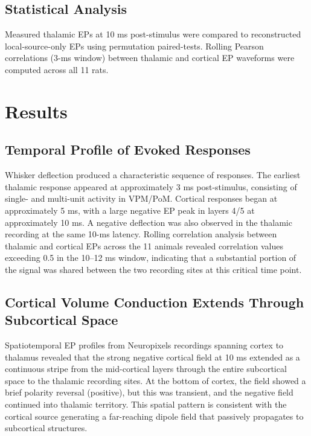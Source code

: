 \documentclass[12pt]{article}
\begin{document}
\subsection{Statistical Analysis}

Measured thalamic EPs at 10 ms post-stimulus were compared to reconstructed local-source-only EPs using permutation paired-tests. Rolling Pearson correlations (3-ms window) between thalamic and cortical EP waveforms were computed across all 11 rats.

\section{Results}

\subsection{Temporal Profile of Evoked Responses}

Whisker deflection produced a characteristic sequence of responses. The earliest thalamic response appeared at approximately 3 ms post-stimulus, consisting of single- and multi-unit activity in VPM/PoM. Cortical responses began at approximately 5 ms, with a large negative EP peak in layers 4/5 at approximately 10 ms. A negative deflection was also observed in the thalamic recording at the same 10-ms latency. Rolling correlation analysis between thalamic and cortical EPs across the 11 animals revealed correlation values exceeding 0.5 in the 10--12 ms window, indicating that a substantial portion of the signal was shared between the two recording sites at this critical time point.

\subsection{Cortical Volume Conduction Extends Through Subcortical Space}

Spatiotemporal EP profiles from Neuropixels recordings spanning cortex to thalamus revealed that the strong negative cortical field at 10 ms extended as a continuous stripe from the mid-cortical layers through the entire subcortical space to the thalamic recording sites. At the bottom of cortex, the field showed a brief polarity reversal (positive), but this was transient, and the negative field continued into thalamic territory. This spatial pattern is consistent with the cortical source generating a far-reaching dipole field that passively propagates to subcortical structures.
\end{document}
